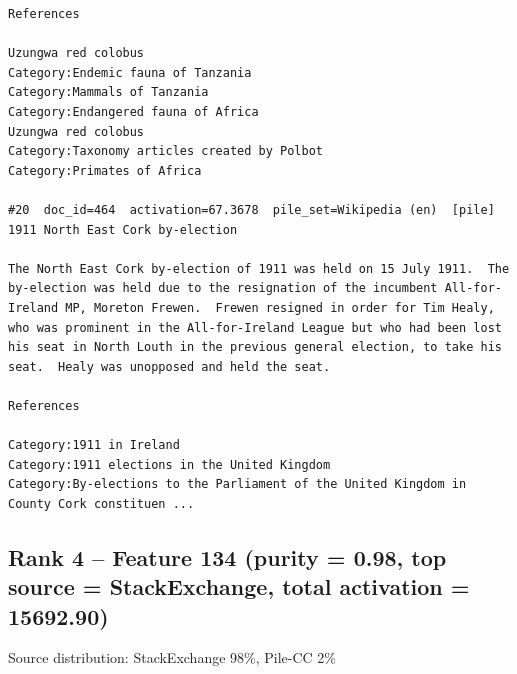 \begin{verbatim}
References

Uzungwa red colobus
Category:Endemic fauna of Tanzania
Category:Mammals of Tanzania
Category:Endangered fauna of Africa
Uzungwa red colobus
Category:Taxonomy articles created by Polbot
Category:Primates of Africa

#20  doc_id=464  activation=67.3678  pile_set=Wikipedia (en)  [pile]
1911 North East Cork by-election

The North East Cork by-election of 1911 was held on 15 July 1911.  The by-election was held due to the resignation of the incumbent All-for-Ireland MP, Moreton Frewen.  Frewen resigned in order for Tim Healy, who was prominent in the All-for-Ireland League but who had been lost his seat in North Louth in the previous general election, to take his seat.  Healy was unopposed and held the seat.

References

Category:1911 in Ireland
Category:1911 elections in the United Kingdom
Category:By-elections to the Parliament of the United Kingdom in County Cork constituen ...

\end{verbatim}

\subsection*{Rank 4 -- Feature 134 (purity = 0.98, top source = StackExchange, total activation = 15692.90)}

Source distribution: StackExchange 98\%, Pile-CC 2\%

